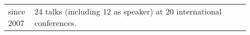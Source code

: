 \documentclass[11pt, a4paper]{article}
\begin{document}
\begin{longtable}{p{0.1\linewidth} P{0.85\linewidth}}
since 2007 & 24 talks (including 12 as speaker) at 20 international conferences.
\end{longtable}
\end{document}
